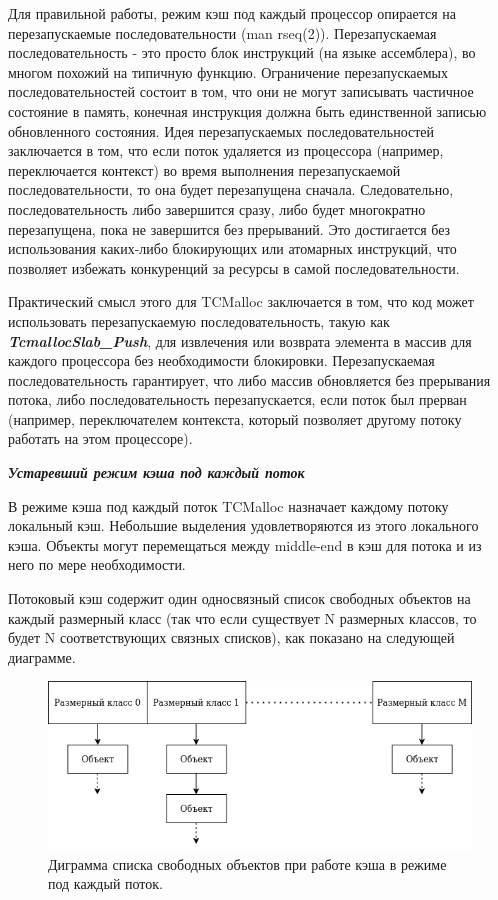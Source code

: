 Для правильной работы, режим кэш под каждый процессор опирается на перезапускаемые последовательности (man rseq(2))\cite{rseq}. Перезапускаемая последовательность - это просто блок инструкций (на языке ассемблера), во многом похожий на типичную функцию. Ограничение перезапускаемых последовательностей состоит в том, что они не могут записывать частичное состояние в память, конечная инструкция должна быть единственной записью обновленного состояния. Идея перезапускаемых последовательностей заключается в том, что если поток удаляется из процессора (например, переключается контекст) во время выполнения перезапускаемой последовательности, то она будет перезапущена сначала. Следовательно, последовательность либо завершится сразу, либо будет многократно перезапущена, пока не завершится без прерываний. Это достигается без использования каких-либо блокирующих или атомарных инструкций, что позволяет избежать конкуренций за ресурсы в самой последовательности.

Практический смысл этого для TCMalloc заключается в том, что код может использовать перезапускаемую последовательность, такую как \textbf{\textit{TcmallocSlab\_Push}}, для извлечения или возврата элемента в массив для каждого процессора без необходимости блокировки. Перезапускаемая последовательность гарантирует, что либо массив обновляется без прерывания потока, либо последовательность перезапускается, если поток был прерван (например, переключателем контекста, который позволяет другому потоку работать на этом процессоре).

\bigbreak
\textit{\textbf{Устаревший режим кэша под каждый поток}}
	
В режиме кэша под каждый поток TCMalloc назначает каждому потоку локальный кэш. Небольшие выделения удовлетворяются из этого локального кэша. Объекты могут перемещаться между middle-end в кэш для потока и из него по мере необходимости.

Потоковый кэш содержит один односвязный список свободных объектов на каждый размерный класс (так что если существует N размерных классов, то будет N соответствующих связных списков), как показано на следующей диаграмме.

\begin{figure}[!h]
	\begin{center}
		\includegraphics[scale=0.6]{images/tcmalloc-per-thread.png}
		\caption{Диграмма списка свободных объектов при работе кэша в режиме под каждый поток.}
		\label{tcmalloc-per-thread}
	\end{center}
\end{figure}

